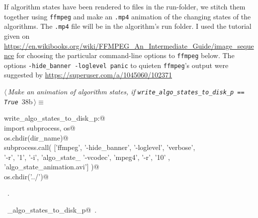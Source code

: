 \documentclass[11.5pt]{report}
\begin{document}
\vspace{-0.8cm}\newchunk If algorithm states have been rendered to files in the run-folder, we stitch them together using \verb|ffmpeg|
and make an \verb|.mp4| animation of the changing states of the algorithms. The \verb|.mp4| file will be in the algorithm's
run folder. I used the  tutorial given on \url{https://en.wikibooks.org/wiki/FFMPEG_An_Intermediate_Guide/image_sequence}
for choosing the particular command-line options to \verb|ffmpeg| below. The options \texttt{-hide\_banner -loglevel panic} 
to quieten \verb|ffmpeg|'s output were suggested by  \url{https://superuser.com/a/1045060/102371} 


\begin{flushleft} \small\label{scrap40}\raggedright\small
{} $\langle\,${\itshape Make an animation of algorithm states, if \verb|write_algo_states_to_disk_p == True|}\nobreak\ {\footnotesize {38b}}$\,\rangle\equiv$
\vspace{-1ex}
\begin{list}{}{} \item
\mbox{}\verb@if write_algo_states_to_disk_p:@\\
\mbox{}\verb@     import subprocess, os@\\
\mbox{}\verb@     os.chdir(dir_name)@\\
\mbox{}\verb@     subprocess.call( ['ffmpeg',  '-hide_banner', '-loglevel', 'verbose', \@\\
\mbox{}\verb@                       '-r', '1',  '-i', 'algo_state_%05d.png', \@\\
\mbox{}\verb@                       '-vcodec', 'mpeg4', '-r', '10' , \@\\
\mbox{}\verb@                       'algo_state_animation.avi']  )@\\
\mbox{}\verb@     os.chdir('../')@\\
\mbox{}\verb@@{\NWsep}
\end{list}
\vspace{-1.5ex}
\footnotesize
\begin{list}{}{\setlength{\itemsep}{-\parsep}\setlength{\itemindent}{-\leftmargin}}
\item \NWtxtMacroRefIn\ .
\item \NWtxtIdentsUsed\nobreak\  \verb@write_algo_states_to_disk_p@\nobreak\ .
\item{}
\end{list}
\vspace{4ex}
\end{flushleft}
\end{document}
